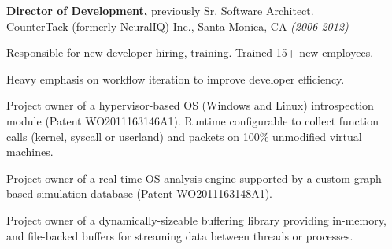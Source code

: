 \documentclass[margin]{res}
\begin{document}
\begin{resume}
{\bf Director of Development,} previously Sr. Software Architect. \\ 
CounterTack (formerly NeuralIQ) Inc., Santa Monica, CA {\em (2006-2012)}
\begin{list}{}{\leftmargin=1.5em \topsep=5pt \partopsep=0pt \parsep=2.5pt}
  \item Responsible for new developer hiring, training.  Trained 15+ 
    new employees.
  \item Heavy emphasis on workflow iteration to improve developer 
    efficiency.
  \item Project owner of a hypervisor-based OS (Windows and Linux)
    introspection module (Patent WO2011163146A1). Runtime configurable to
    collect function calls (kernel, syscall or userland) and packets
    on 100\% unmodified virtual machines.
  \item Project owner of a real-time OS analysis engine supported by a
    custom graph-based simulation database (Patent WO2011163148A1).
  \item Project owner of a dynamically-sizeable buffering library
    providing in-memory, and file-backed buffers for streaming
    data between threads or processes.
\end{list}




\end{resume}
\end{document}
